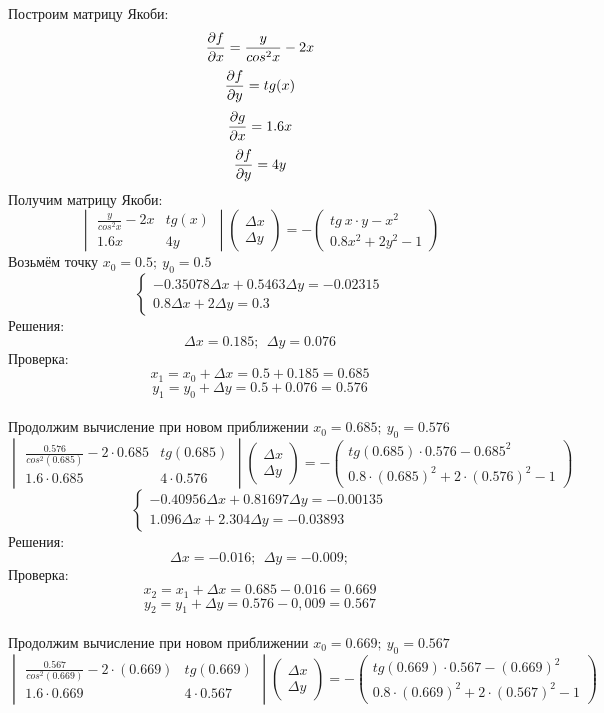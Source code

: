 \documentclass{article}
\begin{document}
Построим матрицу Якоби:
\[\pdv{f}{x} = \frac{y}{cos^2x} - 2x\]
\[\pdv{f}{y} = tg(x)\]
\[\pdv{g}{x} = 1.6x\]
\[\pdv{f}{y} = 4y\]
Получим матрицу Якоби:
\[
    \begin{vmatrix}
        \frac{y}{cos^2x} - 2x & tg(x)\\
        1.6x & 4y 
    \end{vmatrix}
    \begin{pmatrix}
        \Delta x\\
        \Delta y
    \end{pmatrix} = -
    \begin{pmatrix}
        tg\ x\cdot y - x^2\\
        0.8x^2+2y^2 - 1
    \end{pmatrix}
\]
Возьмём точку $x_0 = 0.5; \ y_0 = 0.5$
\[\begin{cases}
    -0.35078\Delta x +0.5463\Delta y = -0.02315\\
    0.8\Delta x + 2\Delta y = 0.3
\end{cases} 
\]
Решения:
\[\Delta x = 0.185; \ \ 
\Delta y = 0.076
\]
Проверка: 
\[x_1 = x_0 + \Delta x = 0.5 + 0.185 = 0.685\]
\[y_1 = y_0 + \Delta y = 0.5 + 0.076 = 0.576\]
\\
Продолжим вычисление при новом приближении $x_0 = 0.685; \ y_0 = 0.576$
\[
    \begin{vmatrix}
        \frac{0.576}{cos^2(0.685)} - 2\cdot 0.685 & tg(0.685)\\
        1.6\cdot 0.685 & 4\cdot0.576 
    \end{vmatrix}
    \begin{pmatrix}
        \Delta x\\
        \Delta y
    \end{pmatrix} = -
    \begin{pmatrix}
        tg(0.685)\cdot 0.576 - 0.685^2\\
        0.8\cdot(0.685)^2+2\cdot(0.576)^2 - 1
    \end{pmatrix}
\]
\[\begin{cases}
    -0.40956\Delta x +0.81697\Delta y = -0.00135\\
    1.096\Delta x + 2.304\Delta y = -0.03893
\end{cases} 
\]
Решения:
\[\Delta x = -0.016; \ \ 
\Delta y = -0.009;
\]
Проверка: 
\[x_2 = x_1 + \Delta x = 0.685 - 0.016 = 0.669\]
\[y_2 = y_1 + \Delta y = 0.576 - 0,009 = 0.567\]
\\
Продолжим вычисление при новом приближении $x_0 = 0.669; \ y_0 = 0.567$
\[
    \begin{vmatrix}
        \frac{0.567}{cos^2(0.669)} - 2\cdot(0.669) & tg(0.669)\\
        1.6\cdot 0.669 & 4\cdot0.567 
    \end{vmatrix}
    \begin{pmatrix}
        \Delta x\\
        \Delta y
    \end{pmatrix} = -
    \begin{pmatrix}
        tg(0.669)\cdot 0.567 - (0.669)^2\\
        0.8\cdot(0.669)^2+2\cdot(0.567)^2 - 1
    \end{pmatrix}
\]
\end{document}
